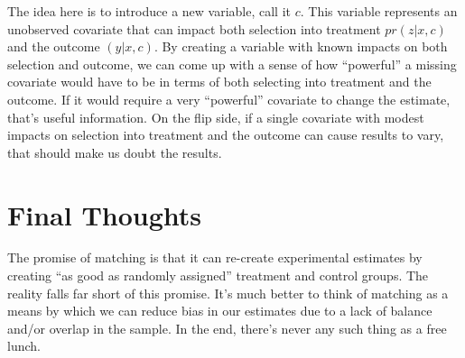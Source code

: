 \documentclass[12pt]{article}
\begin{document}
The idea here is to introduce a new variable, call it $c$. This
variable represents an unobserved covariate that can impact both
selection into treatment $pr(z|x,c)$ and the outcome $(y|x,c)$. By
creating a variable with known impacts on both selection and outcome,
we can come up with a sense of how ``powerful'' a missing covariate
would have to be in terms of both selecting into treatment and the
outcome. If it would require a very ``powerful'' covariate to change
the estimate, that's useful information. On the flip side, if a single
covariate with modest impacts on selection into treatment and the
outcome can cause results to vary, that should make us doubt the
results. 


\section{Final  Thoughts}
\label{sec:final-thoughts}

The promise of matching is that it can re-create experimental
estimates by creating ``as good as randomly assigned'' treatment and
control groups. The reality falls far short of this promise. It's much
better to think of matching as a means by which we can reduce bias in
our estimates due to a lack of balance and/or overlap in the
sample. In the end, there's never any such thing as a free lunch. 
\end{document}
